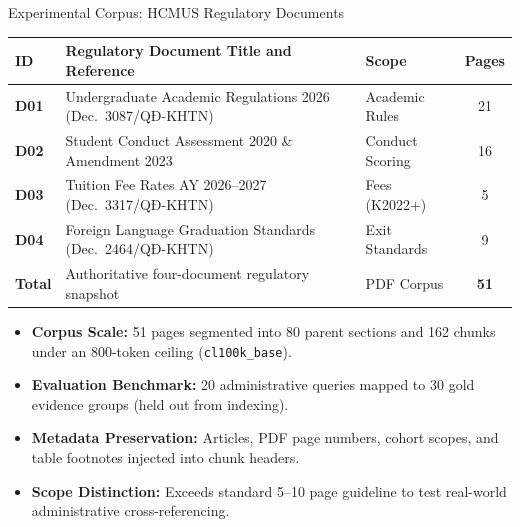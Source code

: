 \begin{frame}{Experimental Corpus: HCMUS Regulatory Documents}
  \vspace{-0.1cm}
  \begin{table}[H]
    \centering
    \footnotesize
    \renewcommand{\arraystretch}{1.15}
    \begin{tabularx}{\textwidth}{>{\bfseries}l X l c}
      \toprule
      \rowcolor{tableheader}
      ID & Regulatory Document Title and Reference & Scope & Pages \\
      \midrule
      D01 & Undergraduate Academic Regulations 2026 (Dec.\ 3087/QĐ-KHTN) & Academic Rules & 21 \\
      D02 & Student Conduct Assessment 2020 \& Amendment 2023 & Conduct Scoring & 16 \\
      D03 & Tuition Fee Rates AY 2026--2027 (Dec.\ 3317/QĐ-KHTN) & Fees (K2022+) & 5 \\
      D04 & Foreign Language Graduation Standards (Dec.\ 2464/QĐ-KHTN) & Exit Standards & 9 \\
      \midrule
      \rowcolor{tablehighlight}
      Total & Authoritative four-document regulatory snapshot & PDF Corpus & \textbf{51} \\
      \bottomrule
    \end{tabularx}
  \end{table}

  \vspace{0.1cm}
  \begin{itemize}
    \setlength{\itemsep}{0.2cm}
    \item \textbf{Corpus Scale:} 51 pages segmented into 80 parent sections and 162 chunks under an 800-token ceiling (\texttt{cl100k\_base}).
    \item \textbf{Evaluation Benchmark:} 20 administrative queries mapped to 30 gold evidence groups (held out from indexing).
    \item \textbf{Metadata Preservation:} Articles, PDF page numbers, cohort scopes, and table footnotes injected into chunk headers.
    \item \textbf{Scope Distinction:} Exceeds standard 5--10 page guideline to test real-world administrative cross-referencing.
  \end{itemize}

\end{frame}
